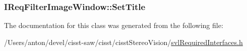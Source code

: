 \subsubsection[{Set\+Title}]{ I\+Req\+Filter\+Image\+Window\+::\+Set\+Title}\label{class_i_req_filter_image_window_a40613d2152c6d25017adf0f724dc04a4}


The documentation for this class was generated from the following file\+:\begin{DoxyCompactItemize}
\item 
/\+Users/anton/devel/cisst-\/saw/cisst/cisst\+Stereo\+Vision/\hyperlink{svl_required_interfaces_8h}{svl\+Required\+Interfaces.\+h}\end{DoxyCompactItemize}

